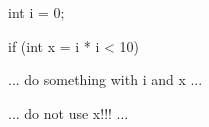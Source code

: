 
\begin{console}

int i = 0;



if (int x = i * i < 10)

{   



    ... do something with i and x ...



}

     ... do not use x!!! ...

\end{console}

